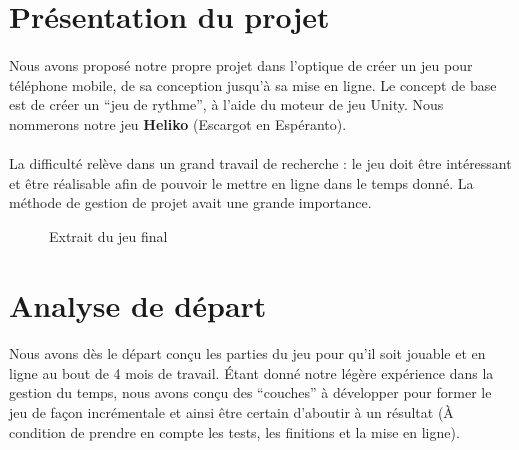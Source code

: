 \section{Présentation du projet}

\paragraph{}
Nous avons proposé notre propre projet dans l’optique de créer un jeu pour téléphone mobile, de sa conception jusqu’à sa mise en ligne. Le concept de base est de créer un “jeu de rythme”, à l'aide du moteur de jeu Unity. Nous nommerons notre jeu \textbf{Heliko} (Escargot en Espéranto).

\paragraph{}
La difficulté relève dans un grand travail de recherche : le jeu doit être intéressant et être réalisable afin de pouvoir le mettre en ligne dans le temps donné. La méthode de gestion de projet avait une grande importance.

\begin{figure}[H]\centering
  \caption{Extrait du jeu final}
  \label{game}
\end{figure}

\section{Analyse de départ}

\paragraph{}
Nous avons dès le départ conçu les parties du jeu pour qu’il soit jouable et en ligne au bout de 4 mois de travail. Étant donné notre légère expérience dans la gestion du temps, nous avons conçu des “couches” à développer pour former le jeu de façon incrémentale et ainsi être certain d’aboutir à un résultat (À condition de prendre en compte les tests, les finitions et la mise en ligne).

